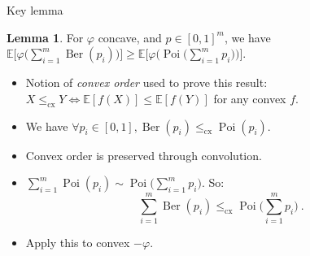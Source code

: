 \documentclass{beamer}
\theoremstyle{definition}
\newtheorem{lem}[theo]{Lemma}
\theoremstyle{remark}
\DeclareMathOperator{\Poi}{\text{Poi}}
\DeclareMathOperator{\Ber}{\text{Ber}}
\begin{document}
\begin{frame}{Key lemma}
  \begin{lem}
    For $\varphi$ concave, and $p \in [0,1]^m$, we have $\mathbb{E}\Big[\varphi\Big(\sum_{i=1}^m\Ber(p_i)\Big)\Big] \geq \mathbb{E}\Big[\varphi\Big(\Poi\Big(\sum_{i=1}^m p_i\Big)\Big)\Big]$.    
    \label{lem:ConvexOrder}
  \end{lem}

  
  \bigskip
  \pause

  \begin{itemize}
  \item Notion of \emph{convex order} used to prove this result: $X \leq_{\text{cx}} Y \iff \mathbb{E}[f(X)] \leq \mathbb{E}[f(Y)]$ for any convex $f$.
    \pause
    \item We have $\forall p_i \in [0,1], \Ber(p_i) \leq_{\text{cx}} \Poi(p_i)$.
    \item Convex order is preserved through convolution.
    \item $\sum_{i=1}^m \Poi(p_i) \sim \Poi\Big(\sum_{i=1}^m p_i\Big)$. So:
      \[\sum_{i=1}^m\Ber(p_i) \leq_{\text{cx}}  \Poi\Big(\sum_{i=1}^m p_i\Big)\ .\]
      \pause
\item Apply this to convex $-\varphi$.
  \end{itemize}
\end{frame}

\end{document}
